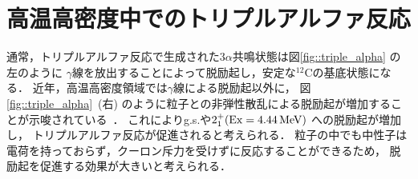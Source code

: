 \documentclass[../master]{subfiles}
\begin{document}
\section{高温高密度中でのトリプルアルファ反応}
\label{seq::triplealphareaction}
通常，トリプルアルファ反応で生成された$3\alpha$共鳴状態は図\ref{fig::triple_alpha} の左のように
$\gamma$線を放出することによって脱励起し，安定な${}^{12}\mathrm{C}$の基底状態になる．
近年，高温高密度領域では$\gamma$線による脱励起以外に，
図\ref{fig::triple_alpha}~(右) のように粒子との非弾性散乱による脱励起が増加することが示唆されている~\cite{hotdensemedium}．
これによりg.s.や$2_{1}^{+} ({\rm Ex} = \SI{4.44}{\mega\electronvolt})$ への脱励起が増加し，
トリプルアルファ反応が促進されると考えられる．
粒子の中でも中性子は電荷を持っておらず，クーロン斥力を受けずに反応することができるため，
脱励起を促進する効果が大きいと考えられる．


\end{document}
